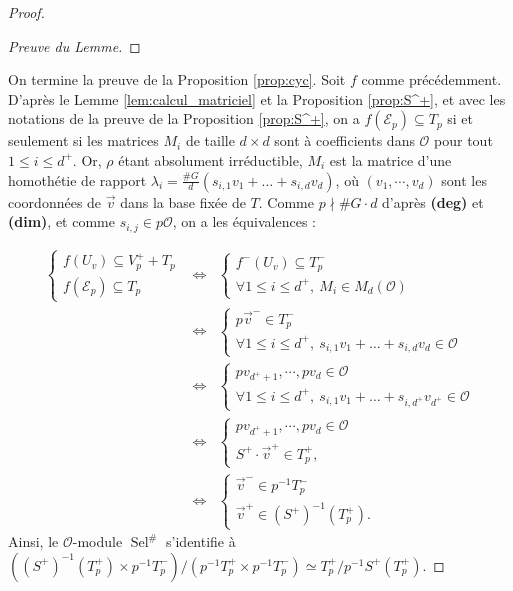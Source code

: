 \documentclass[12pt]{amsart}
\newcommand\cE{\mathcal{E}}
\newcommand\cO{\mathcal{O}}
\DeclareMathOperator{\Sel}{Sel}
\theoremstyle{defstyle}
\theoremstyle{thmstyle}
\begin{document}
\begin{proof}
\begin{proof}[Preuve du Lemme]
	\end{proof}
	On termine la preuve de la Proposition \ref{prop:cyc}. Soit $f$ comme précédemment. D'après le Lemme \ref{lem:calcul_matriciel} et la Proposition \ref{prop:S^+}, et avec les notations de la preuve de la Proposition \ref{prop:S^+}, on a $f(\cE_p)\subseteq T_p$ si et seulement si les matrices $M_i$ de taille $d\times d$ sont à coefficients dans $\cO$ pour tout $1\leq i \leq d^+$. Or, $\rho$ étant absolument irréductible, $M_i$ est la matrice d'une homothétie de rapport $\lambda_i=\frac{\#G}{d} \left(s_{i,1}v_1+\ldots + s_{i,d}v_d\right)$, où $(v_1,\cdots,v_d)$ sont les coordonnées de $\vec{v}$ dans la base fixée de $T$. Comme $p\nmid \#G \cdot d$ d'après \textbf{(deg)} et \textbf{(dim)}, et comme $s_{i,j}\in p\cO$, on a les équivalences : 
	
	$$\begin{array}{rcl}
	\left\{\begin{array}{l}
	f(U_{v}) \subseteq V_p^+ +T_p \\ f(\cE_p)\subseteq T_p 
	\end{array}\right. &\Longleftrightarrow & \left\{\begin{array}{l}
	f^-(U_{v}) \subseteq T_p^- \\ \forall 1\leq i \leq d^+, \  M_i\in M_d(\cO) 
	\end{array}\right. \\
	&\Longleftrightarrow & \left\{\begin{array}{l}
	p\vec{v}^-\in T_p^- \\ \forall 1 \leq i \leq d^+, \ s_{i,1}v_1+\ldots + s_{i,d}v_{d}\in \cO
	\end{array}\right. \\
	&\Longleftrightarrow & \left\{\begin{array}{l}
	pv_{d^++1},\cdots,pv_d\in \cO \\ \forall 1 \leq i \leq d^+, \ s_{i,1}v_1+\ldots + s_{i,d^+}v_{d^+}\in \cO 
	\end{array}\right. \\
	&\Longleftrightarrow & \left\{\begin{array}{l}
	pv_{d^++1},\cdots,pv_d\in \cO \\ S^+ \cdot\vec{v}^+ \in T_p^+ ,
	\end{array}\right. \\
	&\Longleftrightarrow & \left\{\begin{array}{l}
	\vec{v}^-\in p^{-1}T_p^- \\ \vec{v}^+ \in \left(S^+\right)^{-1}(T_p^+).
	\end{array}\right. 
	\end{array}
	$$
	Ainsi, le $\cO$-module $\Sel^\#$ s'identifie à $\left(\left(S^+\right)^{-1}(T_p^+) \times p^{-1}T_p^-\right) /\left(p^{-1}T_p^+ \times p^{-1}T_p^-\right) \simeq T_p^+/p^{-1}S^+\left(T_p^+\right)$.
	
\end{proof} 
\end{document}

